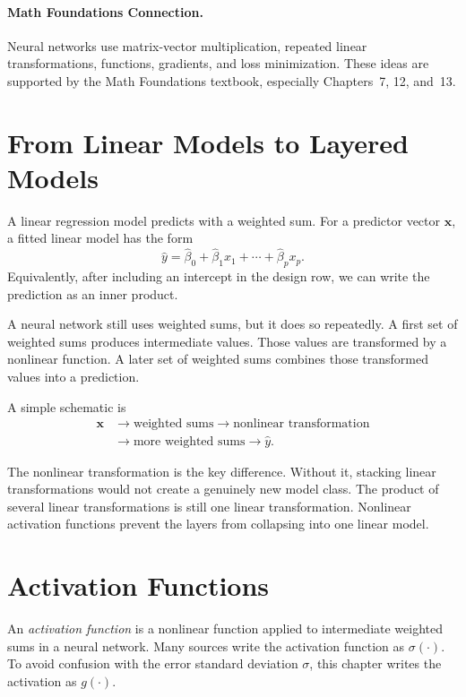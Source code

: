 \paragraph{Math Foundations Connection.}
Neural networks use matrix-vector multiplication, repeated linear transformations, functions, gradients, and loss minimization.  These ideas are supported by the Math Foundations textbook, especially Chapters~7, 12, and~13.

\section{From Linear Models to Layered Models}

A linear regression model predicts with a weighted sum.  For a predictor vector \(\mathbf{x}\), a fitted linear model has the form
\begin{equation}
  \widehat{y}=\widehat{\beta}_0+\widehat{\beta}_1x_1+\cdots+\widehat{\beta}_px_p.
\end{equation}
Equivalently, after including an intercept in the design row, we can write the prediction as an inner product.

A neural network still uses weighted sums, but it does so repeatedly.  A first set of weighted sums produces intermediate values.  Those values are transformed by a nonlinear function.  A later set of weighted sums combines those transformed values into a prediction.

A simple schematic is
\begin{equation}
\begin{aligned}
  \mathbf{x}
  &\longrightarrow \text{weighted sums}
  \longrightarrow \text{nonlinear transformation}\\
  &\longrightarrow \text{more weighted sums}
  \longrightarrow \widehat{y}.
\end{aligned}
\end{equation}

The nonlinear transformation is the key difference.  Without it, stacking linear transformations would not create a genuinely new model class.  The product of several linear transformations is still one linear transformation.  Nonlinear activation functions prevent the layers from collapsing into one linear model.

\section{Activation Functions}

An \emph{activation function} is a nonlinear function applied to intermediate weighted sums in a neural network.  Many sources write the activation function as \(\sigma(\cdot)\).  To avoid confusion with the error standard deviation \(\sigma\), this chapter writes the activation as \(g(\cdot)\).

